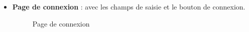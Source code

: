 \documentclass[12pt]{report}
\begin{document}
\begin{itemize}
	
	\item \textbf{Page de connexion} : avec les champs de saisie et le bouton de connexion.
	
	\begin{figure}[H]
		\centering
		\begin{minipage}[t]{0.5\textwidth}
			\centering
			\caption{Page de connexion}
		\end{minipage}
	\end{figure}
	

\end{itemize}
\end{document}
